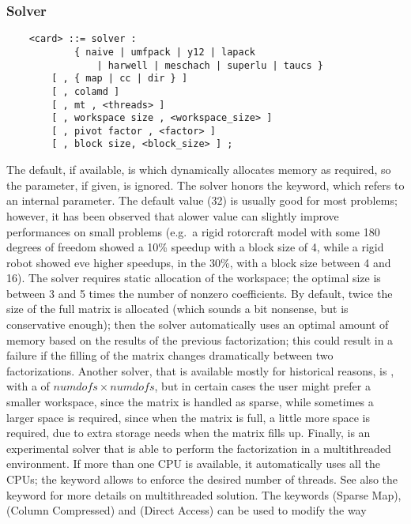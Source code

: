 \subsubsection{Solver}   
\begin{verbatim}
    <card> ::= solver :
            { naive | umfpack | y12 | lapack 
                | harwell | meschach | superlu | taucs }
        [ , { map | cc | dir } ]
        [ , colamd ]
        [ , mt , <threads> ]
        [ , workspace size , <workspace_size> ] 
        [ , pivot factor , <factor> ]
        [ , block size, <block_size> ] ;
\end{verbatim}
The default, if available, is  which dynamically
allocates memory as required, so the  
parameter, if given, is ignored.
The  solver honors the  keyword,
which refers to an internal parameter.
The default value (32) is usually good for most problems; however,
it has been observed that alower value can slightly improve
performances on small problems (e.g.\ a rigid rotorcraft model
with some 180 degrees of freedom showed a 10\% speedup with 
a block size of 4, while a rigid robot showed eve higher speedups,
in the 30\%, with a block size between 4 and 16).
The  solver requires static allocation of the workspace;
the optimal size is between 3 and 5 times the number of nonzero 
coefficients.
By default, twice the size of the full matrix is allocated
(which sounds a bit nonsense, but is conservative enough);
then the solver automatically uses an optimal amount of memory
based on the results of the previous factorization; this could
result in a failure if the filling of the matrix changes 
dramatically between two factorizations.
Another solver, that is available mostly for historical reasons, 
is , with a 
of $ numdofs\times{numdofs} $, but in certain cases the user
might prefer a smaller workspace, since the matrix is handled as sparse,
while sometimes a larger space is required, since when the matrix is
full, a little more space is required, due to extra storage needs when
the matrix fills up.
Finally,  is an experimental solver that is able to perform
the factorization in a multithreaded environment.
If more than one CPU is available, it automatically uses all the CPUs;
the keyword  allows to enforce the desired number of threads.
See also the  keyword for more details on multithreaded
solution.
The keywords  (Sparse Map),  (Column Compressed)
and  (Direct Access) can be used to modify the way
